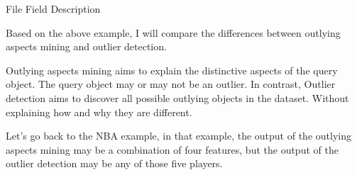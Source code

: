 \documentclass[
 size=14pt,
 paper=smartboard,  %
 mode=present, 		%
 display=slides, 	%
 style=tuliplab,  	%
 pauseslide,
 fleqn,leqno]{powerdot}
\begin{document}
\begin{slide}[toc=,bm=]{File Field Description}
\begin{center}

\end{center}

\bigskip


\begin{note}
Based on the above example,
I will compare the differences
between outlying aspects mining and outlier detection.

Outlying aspects mining aims to
explain the distinctive aspects of the query object.
The query object may or may not be an outlier.
In contrast,
Outlier detection aims to discover all possible
outlying objects in the dataset.
Without explaining how and why they are different.

Let's go back to the NBA example,
in that example,
the output of the outlying aspects mining may be
a combination of four features,
but the output of the outlier detection may be any of those five players.
\end{note}

\end{slide}
\end{document}
